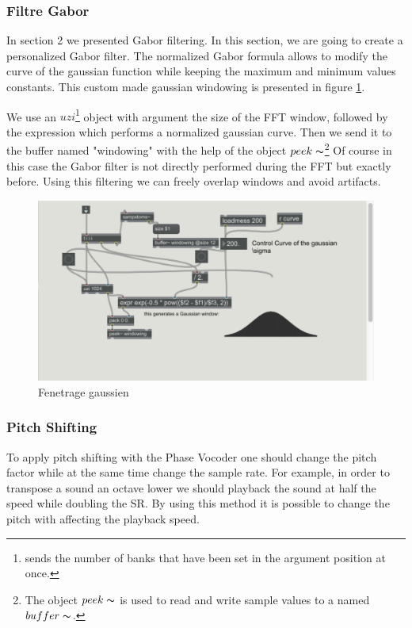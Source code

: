 \subsubsection{Filtre Gabor}

In section 2 we presented Gabor filtering. In this section, we are going to create a personalized Gabor filter. The normalized Gabor formula allows to modify the curve of the gaussian function while keeping the maximum and minimum values constants. This custom made gaussian windowing is presented in figure \ref{windowing}. 

We use an $uzi$\footnote{sends the number of banks that have been set in the argument position at once. } object with argument the size of the FFT window, followed by the expression which performs a normalized gaussian curve. Then we send it to the buffer named "windowing" with the help of the object $peek\thicksim$\footnote{The object $peek\thicksim$ is used to read and write sample values to a named $buffer\thicksim$.} Of course in this case the Gabor filter is not directly performed during the FFT but exactly before. Using this filtering we can freely overlap windows and avoid artifacts.
    
    \begin{figure}
        \centering
        \includegraphics[width = \textwidth]{Graphs/windowing.png}
        \caption{Fenetrage gaussien}
        \label{windowing}
    \end{figure}

\subsubsection{Pitch Shifting}

    To apply pitch shifting with the Phase Vocoder one should change the pitch factor while at the same time change the sample rate. For example, in order to transpose a sound an octave lower we should playback the sound at half the speed while doubling the SR. By using this method it is possible to change the pitch with affecting the playback speed.

